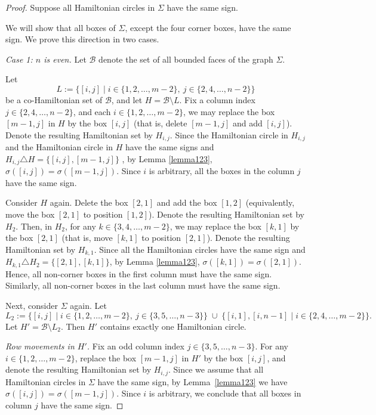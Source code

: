 \documentclass[10pt,a4paper]{amsart}
\begin{document}
\begin{proof}
Suppose all Hamiltonian circles in $\Sigma$  have the same sign.



We will show  that all boxes of $\Sigma$, except the four corner boxes, have the same sign.
We prove this direction in two cases.

\medskip
\noindent\emph{Case 1: $n$ is even.}
Let $\mathcal{B}$ denote the set of all bounded faces of the graph $\Sigma$.

Let
\[
L:=\{[i,j]\mid i\in \{1,2,\dots,m-2\},\ j\in \{2,4,\dots,n-2\}\}
\]
be a co-Hamiltonian set of $\mathcal{B}$, and let $H=\mathcal{B}\setminus L$.
Fix a column index  $j\in\{2,4,\dots,n-2\}$, and each $i\in\{1,2,\dots,m-2\}$,
we may replace the box $[m-1,j]$ in $H$ by the box $[i,j]$
(that is, delete $[m-1,j]$ and add $[i,j]$).
Denote the resulting Hamiltonian set by $H_{i,j}$.
 Since the Hamiltonian circle in $H_{i,j}$
and the Hamiltonian circle in $H$ have the same signs and $H_{i,j}\triangle H=\{[i,j],[m-1,j]\}$ , by Lemma \ref{lemma123}, $\sigma([i,j])=\sigma([m-1,j])$. Since $i$ is arbitrary, all the boxes in the column $j$ have the same sign. 


Consider $H$ again. Delete the box $[2,1]$ and add the box $[1,2]$
(equivalently, move the box $[2,1]$ to position $[1,2]$).
Denote the resulting Hamiltonian set by $H_2$.
Then, in $H_2$, for any $k\in\{3,4,\dots,m-2\}$, we may replace the box $[k,1]$
by the box $[2,1]$ (that is, move $[k,1]$ to position $[2,1]$).
Denote the resulting Hamiltonian set by $H_{k,1}$. Since all the Hamiltonian circles have the same sign and $H_{k,1}\triangle H_2=\{[2,1],[k,1]\}$, by Lemma \ref{lemma123}, $\sigma([k,1])=\sigma([2,1])$. Hence, all non-corner boxes in the first column must have the same sign. Similarly, all non-corner boxes in the last column must have the same sign.



Next, consider $\Sigma$ again. Let
\[
L_2:= \{[i,j]\mid i\in \{1,2,\dots,m-2\},\ j\in \{3,5,\dots,n-3\}\}
\;\cup\;
\{[i,1],[i,n-1]\mid i\in \{2,4,\dots,m-2\}\}.
\]
Let $H'=\mathcal{B}\setminus L_2$.
Then $H'$ contains exactly one Hamiltonian circle.

\medskip
\noindent\emph{Row movements in $H'$.}
Fix an odd column index $j\in\{3,5,\dots,n-3\}$.
For any $i\in\{1,2,\dots,m-2\}$, replace the box $[m-1,j]$ in $H'$
by the box $[i,j]$, and denote the resulting Hamiltonian set by $H_{i,j}$. Since we assume that all Hamiltonian circles in $\Sigma$ have the same sign, by Lemma~\ref{lemma123} we have
$\sigma([i,j])=\sigma([m-1,j])$.
Since $i$ is arbitrary, we conclude that all boxes in column $j$ have the same sign.



\end{proof}
\end{document}
